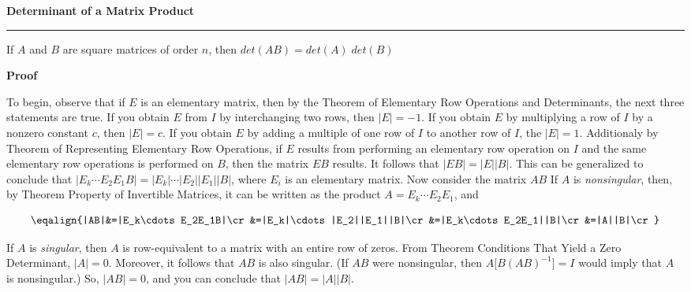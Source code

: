 \nopagenumbers
{\bf Determinant of a Matrix Product}
\vskip 1mm
\hrule

\vskip 6pt
If $A$ and $B$ are square matrices of order $n$, then $det(AB)=det(A)\;det(B)$

\vskip 10pt
{\bf Proof}

\vskip 6pt
To begin, observe that if $E$ is an elementary matrix, then by the Theorem of Elementary Row Operations and Determinants, the next three statements are true. If you obtain $E$ from $I$ by interchanging two rows, then $|E|=-1$. If you obtain $E$ by multiplying a row of $I$ by a nonzero constant $c$, then $|E|=c$. If you obtain $E$ by adding a multiple of one row of $I$ to another row of $I$, the $|E|=1$. Additionaly by Theorem of Representing Elementary Row Operations, if $E$ results from performing an elementary row operation on $I$ and the same elementary row operations is performed on $B$, then the matrix $EB$ results. It follows that $|EB|=|E||B|$.
\vskip 1mm
This can be generalized to conclude that $|E_k\cdots E_2E_1B|=|E_k|\cdots |E_2||E_1||B|$, where $E_i$ is an elementary matrix. Now consider the matrix $AB$ If $A$ is {\it nonsingular}, then, by Theorem Property of Invertible Matrices, it can be written as the product $A=E_k\cdots E_2E_1$, and

$$\eqalign{|AB|&=|E_k\cdots E_2E_1B|\cr
		&=|E_k|\cdots |E_2||E_1||B|\cr
		&=|E_k\cdots E_2E_1||B|\cr
		&=|A||B|\cr}$$

If $A$ is {\it singular}, then $A$ is row-equivalent to a matrix with an entire row of zeros. From Theorem Conditions That Yield a Zero Determinant, $|A|=0$. Moreover, it follows that $AB$ is also singular. (If $AB$ were nonsingular, then $A\bigl\lbrack B(AB)^{-1}\bigr\rbrack=I$ would imply that $A$ is nonsingular.) So, $|AB|=0$, and you can conclude that $|AB|=|A||B|$.
\vfill\eject
\bye
